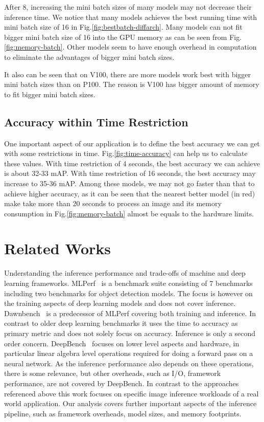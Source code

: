\documentclass[conference]{IEEEtran}
\begin{document}
After 8, increasing the mini batch sizes of many models may not decrease their inference time. We notice that many models achieves the best running time with mini batch size of 16 in Fig.\ref{fig:bestbatch-diffarch}. Many models can not fit bigger mini batch size of 16 into the GPU memory as can be seen from Fig.\ref{fig:memory-batch}. Other models seem to have enough overhead in computation to eliminate the advantages of bigger mini batch sizes.

It also can be seen that on V100, there are more models work best with bigger mini batch sizes than on P100. The reason is V100 has bigger amount of memory to fit bigger mini batch sizes.

\subsection{Accuracy within Time Restriction}
One important aspect of our application is to define the best accuracy we can get with some restrictions in time. Fig.\ref{fig:time-accuracy} can help us to calculate these values. With time restriction of 4 seconds, the best accuracy we can achieve is about 32-33 mAP. With time restriction of 16 seconds, the best accuracy may increase to 35-36 mAP. Among these models, we may not go faster than that to achieve higher accuracy, as it can be seen that the nearest better model (in red) make take more than 20 seconds to process an image and its memory consumption in Fig.\ref{fig:memory-batch} almost be equals to the hardware limits.



\section{Related Works}

Understanding the inference performance and trade-offs of machine and deep learning frameworks. MLPerf~\cite{mlperf} is a benchmark suite consisting of 7 benchmarks including two benchmarks for object detection models. The focus is however on the training aspects of deep learning models and does not cover inference. Dawnbench~\cite{dawnbench} is a predecessor of MLPerf covering both training and inference. In contrast to older deep learning benchmarks it uses the time to accuracy as primary metric and does not solely focus on accuracy. Inference is only a second order concern. DeepBench~\cite{deepbench} focuses on lower level aspects and hardware, in particular linear algebra level operations required for doing a forward pass on a neural network. As the inference performance also depends on these operations, there is some relevance, but other overheads, such as I/O, framework performance, are not covered by DeepBench. In contrast to the approaches referenced above this work focuses on specific image inference workloads of a real world application. Our analysis covers further important aspects of the inference pipeline, such as framework overheads, model sizes, and memory footprints.
\end{document}
